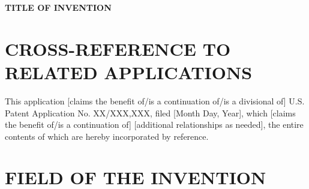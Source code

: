 \documentclass[12pt,letterpaper]{article}
\begin{document}
\begin{center}
\Large\bfseries
TITLE OF INVENTION
\end{center}

\vspace{0.5in}


\vspace{1in}

\section*{CROSS-REFERENCE TO RELATED APPLICATIONS}


This application [claims the benefit of/is a continuation of/is a divisional of] U.S. Patent Application No. XX/XXX,XXX, filed [Month Day, Year], which [claims the benefit of/is a continuation of] [additional relationships as needed], the entire contents of which are hereby incorporated by reference.

\section*{FIELD OF THE INVENTION}

\end{document}
